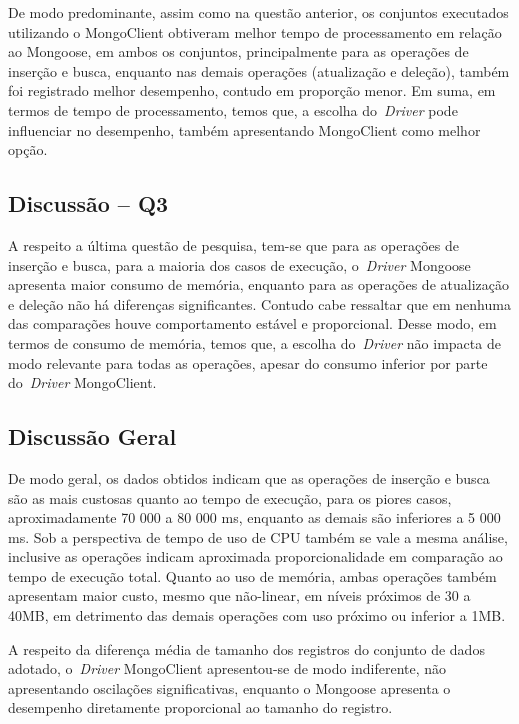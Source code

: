 \documentclass[12pt]{article}
\begin{document}
De modo predominante, assim como na questão anterior, os conjuntos executados utilizando o MongoClient obtiveram melhor tempo de processamento em relação ao Mongoose, em ambos os conjuntos, principalmente para as operações de inserção e busca, enquanto nas demais operações (atualização e deleção), também foi registrado melhor desempenho, contudo em proporção menor.
Em suma, em termos de tempo de processamento, temos que, a escolha do~\emph{Driver} pode influenciar no desempenho, também apresentando MongoClient como melhor opção.

\subsection{Discussão -- Q3}
\label{q3}

A respeito a última questão de pesquisa, tem-se que para as operações de inserção e busca, para a maioria dos casos de execução, o~\emph{Driver} Mongoose apresenta maior consumo de memória, enquanto para as operações de atualização e deleção não há diferenças significantes.
Contudo cabe ressaltar que em nenhuma das comparações houve comportamento estável e proporcional.
Desse modo, em termos de consumo de memória, temos que, a escolha do~\emph{Driver} não impacta de modo relevante para todas as operações, apesar do consumo inferior por parte do~\emph{Driver} MongoClient.

\subsection{Discussão Geral}
\label{qgeral}

De modo geral, os dados obtidos indicam que as operações de inserção e busca são as mais custosas quanto ao tempo de execução, para os piores casos, aproximadamente 70 000 a 80 000 ms, enquanto as demais são inferiores a 5 000 ms.
Sob a perspectiva de tempo de uso de CPU também se vale a mesma análise, inclusive as operações indicam aproximada proporcionalidade em comparação ao tempo de execução total.
Quanto ao uso de memória, ambas operações também apresentam maior custo, mesmo que não-linear, em níveis próximos de 30 a 40MB, em detrimento das demais operações com uso próximo ou inferior a 1MB.

A respeito da diferença média de tamanho dos registros do conjunto de dados adotado, o~\emph{Driver} MongoClient apresentou-se de modo indiferente, não apresentando oscilações significativas, enquanto o Mongoose apresenta o desempenho diretamente proporcional ao tamanho do registro.
\end{document}
